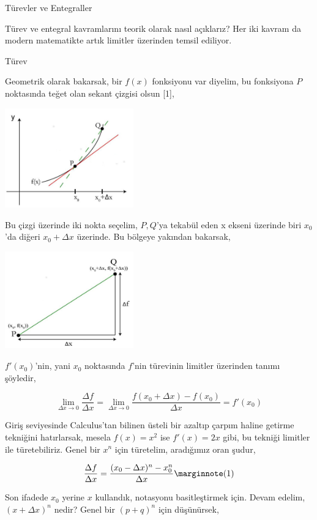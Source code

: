 \documentclass[12pt,fleqn]{article}\usepackage{../../common}
\begin{document}
Türevler ve Entegraller

Türev ve entegral kavramlarını teorik olarak nasıl açıklarız? Her iki kavram da
modern matematikte artık limitler üzerinden temsil ediliyor.

Türev

Geometrik olarak bakarsak, bir $f(x)$ fonksiyonu var diyelim, bu fonksiyona $P$
noktasında teğet olan sekant çizgisi olsun [1],

\includegraphics[width=15em]{ode_mattuck_65_diffint1_01.jpg}

Bu çizgi üzerinde iki nokta seçelim, $P,Q$'ya tekabül eden x ekseni üzerinde
biri $x_0$'da diğeri $x_0 + \Delta x$ üzerinde. Bu bölgeye yakından bakarsak,

\includegraphics[width=15em]{ode_mattuck_65_diffint1_02.jpg}

$f'(x_0)$'nin, yani $x_0$ noktasında $f$'nin türevinin limitler üzerinden tanımı
şöyledir,

$$
\lim_{\Delta x \to 0} \frac{\Delta f}{\Delta x} =
\lim_{\Delta x \to 0} \frac{f(x_0 + \Delta x) - f(x_0)}{\Delta x} =
f'(x_0)
$$

Giriş seviyesinde Calculus'tan bilinen üsteli bir azaltıp çarpım haline getirme
tekniğini hatırlarsak, mesela $f(x) = x^2$ ise $f'(x) = 2x$ gibi, bu tekniği
limitler ile türetebiliriz. Genel bir $x^n$ için türetelim, aradığımız oran
şudur,

$$
\frac{\Delta f}{\Delta x} = \frac{(x_0-\Delta x)^n - x_0^n}{\Delta x}
\mlabel{1}
$$

Son ifadede $x_0$ yerine $x$ kullandık, notasyonu basitleştirmek için. Devam
edelim, $(x+\Delta x)^n$ nedir? Genel bir $(p + q)^n$ için düşünürsek,
\end{document}
